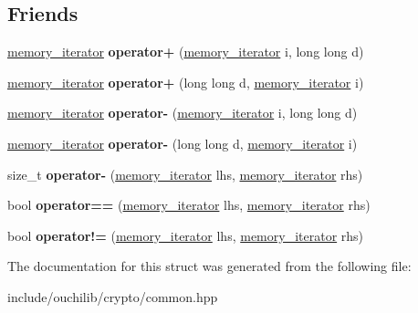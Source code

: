 \subsection*{Friends}
\begin{DoxyCompactItemize}
\item 
\mbox{\label{structouchi_1_1crypto_1_1memory__iterator_a6ee3b7ceed57a42ac30d4d8021c85eac}} 
\mbox{\hyperlink{structouchi_1_1crypto_1_1memory__iterator}{memory\+\_\+iterator}} {\bfseries operator+} (\mbox{\hyperlink{structouchi_1_1crypto_1_1memory__iterator}{memory\+\_\+iterator}} i, long long d)
\item 
\mbox{\label{structouchi_1_1crypto_1_1memory__iterator_a8a9c43283259dbf2bb9a18cd102b88a6}} 
\mbox{\hyperlink{structouchi_1_1crypto_1_1memory__iterator}{memory\+\_\+iterator}} {\bfseries operator+} (long long d, \mbox{\hyperlink{structouchi_1_1crypto_1_1memory__iterator}{memory\+\_\+iterator}} i)
\item 
\mbox{\label{structouchi_1_1crypto_1_1memory__iterator_a2f0e1a1451ecc907753cdd83f352dc3b}} 
\mbox{\hyperlink{structouchi_1_1crypto_1_1memory__iterator}{memory\+\_\+iterator}} {\bfseries operator-\/} (\mbox{\hyperlink{structouchi_1_1crypto_1_1memory__iterator}{memory\+\_\+iterator}} i, long long d)
\item 
\mbox{\label{structouchi_1_1crypto_1_1memory__iterator_a61d42b7a9f3fde05148f1ea2f013e52d}} 
\mbox{\hyperlink{structouchi_1_1crypto_1_1memory__iterator}{memory\+\_\+iterator}} {\bfseries operator-\/} (long long d, \mbox{\hyperlink{structouchi_1_1crypto_1_1memory__iterator}{memory\+\_\+iterator}} i)
\item 
\mbox{\label{structouchi_1_1crypto_1_1memory__iterator_a97e9997aaa04ac3d0c4c44d1d7c0b4ac}} 
size\+\_\+t {\bfseries operator-\/} (\mbox{\hyperlink{structouchi_1_1crypto_1_1memory__iterator}{memory\+\_\+iterator}} lhs, \mbox{\hyperlink{structouchi_1_1crypto_1_1memory__iterator}{memory\+\_\+iterator}} rhs)
\item 
\mbox{\label{structouchi_1_1crypto_1_1memory__iterator_a3e6efc3e85ff6d1ab6deacef4b612b53}} 
bool {\bfseries operator==} (\mbox{\hyperlink{structouchi_1_1crypto_1_1memory__iterator}{memory\+\_\+iterator}} lhs, \mbox{\hyperlink{structouchi_1_1crypto_1_1memory__iterator}{memory\+\_\+iterator}} rhs)
\item 
\mbox{\label{structouchi_1_1crypto_1_1memory__iterator_a59abe5f324e86e9de728562217d5e172}} 
bool {\bfseries operator!=} (\mbox{\hyperlink{structouchi_1_1crypto_1_1memory__iterator}{memory\+\_\+iterator}} lhs, \mbox{\hyperlink{structouchi_1_1crypto_1_1memory__iterator}{memory\+\_\+iterator}} rhs)
\end{DoxyCompactItemize}


The documentation for this struct was generated from the following file\+:\begin{DoxyCompactItemize}
\item 
include/ouchilib/crypto/common.\+hpp\end{DoxyCompactItemize}

